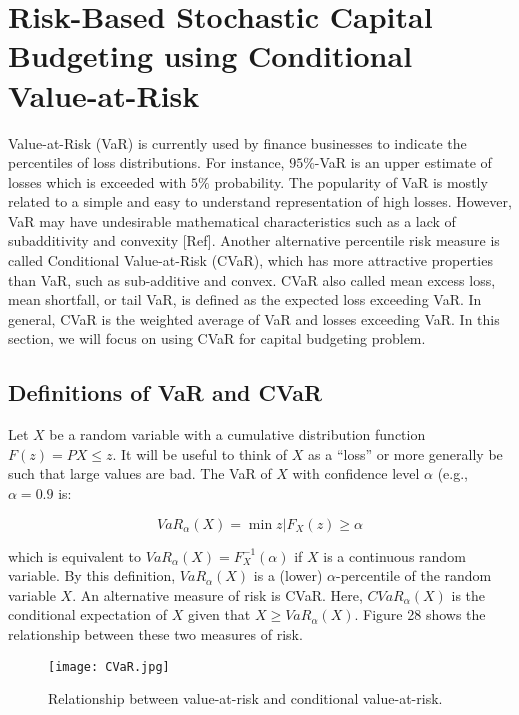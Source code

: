 \section{Risk-Based Stochastic Capital Budgeting using Conditional Value-at-Risk}
\label{sec:CVaR}

Value-at-Risk (VaR) is currently used by finance businesses to indicate the percentiles
of loss distributions. For instance, $95\%$-VaR is an upper estimate of losses which
is exceeded with $5\%$ probability. The popularity of VaR is mostly related to a simple
and easy to understand representation of high losses. However, VaR may have undesirable
mathematical characteristics such as a lack of subadditivity and convexity [Ref].
Another alternative percentile risk measure is called Conditional Value-at-Risk (CVaR),
which has more attractive properties than VaR, such as sub-additive and convex.
CVaR also called mean excess loss, mean shortfall, or tail VaR, is defined as the
expected loss exceeding VaR. In general, CVaR is the weighted average of VaR and
losses exceeding VaR. In this section, we will focus on using CVaR for capital
budgeting problem.

\subsection{Definitions of VaR and CVaR}
\label{definitionCVaR}
Let $X$ be a random variable with a cumulative distribution function
$F(z) = P{X\le z}$. It will be useful to think of $X$ as a ``loss'' or more generally
be such that large values are bad. The VaR of $X$ with confidence level
$\alpha$ (e.g., $\alpha = 0.9$ is:

\begin{equation}
VaR_\alpha (X) = \min {z|F_X(z)\ge \alpha}
\end{equation}

which is equivalent to $VaR_\alpha (X) = F_{X}^{-1}(\alpha)$ if $X$ is a continuous
random variable. By this definition, $VaR_\alpha (X)$ is a (lower) $\alpha$-percentile
of the random variable $X$. An alternative measure of risk is CVaR. Here, $CVaR_\alpha (X)$
is the conditional expectation of $X$ given that $X \ge VaR_\alpha (X)$.
Figure 28 shows the relationship between these two measures of risk.

\begin{figure}
    \centering
    \centerline{\texttt{[image: CVaR.jpg]}}
    \caption{Relationship between value-at-risk and conditional value-at-risk.}
    \label{fig:CVaR}
\end{figure}


